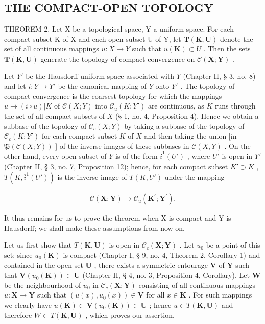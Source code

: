 \subsection{THE COMPACT-OPEN TOPOLOGY}

THEOREM 2. Let X be a topological space, Y a uniform space. For each compact subset K of X and each open subset U of Y, let \(\mathbf{T}(\mathbf{K},\mathbf{U})\) denote the set of all continuous mappings \(u:X\to Y\) such that \(u(\mathbf{K})\subset U\) . Then the sets \(\mathbf{T}(\mathbf{K},\mathbf{U})\) generate the topology of compact convergence on \(\mathcal{C}(\mathbf{X};\mathbf{Y})\) .

Let \(Y'\) be the Hausdorff uniform space associated with \(Y\) (Chapter II, § 3, no. 8) and let \(i: Y \to Y'\) be the canonical mapping of \(Y\) onto \(Y'\) . The topology of compact convergence is the coarsest topology for which the mappings \(u \to (i \circ u)|K\) of \(\mathcal{C}(X; Y)\) into \(\mathcal{C}_u(K; Y')\) are continuous, as \(K\) runs through the set of all compact subsets of \(X\) (§ 1, no. 4, Proposition 4). Hence we obtain a subbase of the topology of \(\mathcal{C}_c(X; Y)\) by taking a subbase of the topology of \(\mathcal{C}_c(K; Y')\) for each compact subset \(K\) of \(X\) and then taking the union {[}in \(\mathfrak{P}(\mathcal{C}(X; Y))\) {]} of the inverse images of these subbases in \(\mathcal{C}(X, Y)\) . On the other hand, every open subset of \(Y\) is of the form \(\overline{i}^1(U')\) , where \(U'\) is open in \(Y'\) (Chapter II, § 3, no. 7, Proposition 12); hence, for each compact subset \(K' \supset K\) , \(T(K, \overline{i}^1(U'))\) is the inverse image of \(T(K, U')\) under the mapping

\[
\mathcal {C} (\mathbf {X}; \mathbf {Y}) \rightarrow \mathcal {C} _ {u} (\mathbf {K} ^ {\prime}; \mathbf {Y} ^ {\prime}).
\]

It thus remains for us to prove the theorem when X is compact and Y is Hausdorff; we shall make these assumptions from now on.

Let us first show that \(T(\mathbf{K}, \mathbf{U})\) is open in \(\mathcal{C}_c(\mathbf{X}; \mathbf{Y})\) . Let \(u_0\) be a point of this set; since \(u_0(\mathbf{K})\) is compact (Chapter I, § 9, no. 4, Theorem 2, Corollary 1) and contained in the open set \(\mathbf{U}\) , there exists a symmetric entourage \(\mathbf{V}\) of \(\mathbf{Y}\) such that \(\mathbf{V}(u_0(\mathbf{K})) \subset \mathbf{U}\) (Chapter II, § 4, no. 3, Proposition 4, Corollary). Let \(\mathbf{W}\) be the neighbourhood of \(u_0\) in \(\mathcal{C}_c(\mathbf{X}; \mathbf{Y})\) consisting of all continuous mappings \(u: \mathbf{X} \to \mathbf{Y}\) such that \((u(x), u_0(x)) \in \mathbf{V}\) for all \(x \in \mathbf{K}\) . For such mappings we clearly have \(u(\mathbf{K}) \subset \mathbf{V}(u_0(\mathbf{K})) \subset \mathbf{U}\) ; hence \(u \in T(\mathbf{K}, \mathbf{U})\) and therefore \(W \subset T(\mathbf{K}, \mathbf{U})\) , which proves our assertion.

